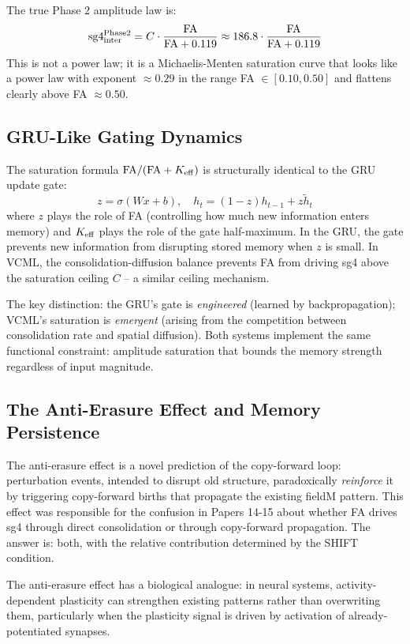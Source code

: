 \documentclass[11pt]{article}
\begin{document}
The true Phase 2 amplitude law is:
\begin{equation}
{\rm sg4}_{\rm inter}^{\rm Phase2} = C \cdot \frac{{\rm FA}}{{\rm FA} + 0.119}
\approx 186.8 \cdot \frac{{\rm FA}}{{\rm FA} + 0.119}
\end{equation}
This is not a power law; it is a Michaelis-Menten saturation curve that
looks like a power law with exponent $\approx 0.29$ in the range
FA $\in [0.10, 0.50]$ and flattens clearly above FA $\approx 0.50$.

\subsection{GRU-Like Gating Dynamics}

The saturation formula ${\rm FA}/({\rm FA} + K_{\rm eff})$ is structurally
identical to the GRU update gate:
\[
z = \sigma(W x + b), \quad h_t = (1-z) h_{t-1} + z \tilde{h}_t
\]
where $z$ plays the role of FA (controlling how much new information
enters memory) and $K_{\rm eff}$ plays the role of the gate half-maximum.
In the GRU, the gate prevents new information from disrupting stored
memory when $z$ is small.
In VCML, the consolidation-diffusion balance prevents FA from driving
sg4 above the saturation ceiling $C$ -- a similar ceiling mechanism.

The key distinction: the GRU's gate is \emph{engineered} (learned by
backpropagation); VCML's saturation is \emph{emergent} (arising from
the competition between consolidation rate and spatial diffusion).
Both systems implement the same functional constraint: amplitude saturation
that bounds the memory strength regardless of input magnitude.

\subsection{The Anti-Erasure Effect and Memory Persistence}

The anti-erasure effect is a novel prediction of the copy-forward loop:
perturbation events, intended to disrupt old structure, paradoxically
\emph{reinforce} it by triggering copy-forward births that propagate
the existing fieldM pattern.
This effect was responsible for the confusion in Papers 14-15 about
whether FA drives sg4 through direct consolidation or through copy-forward
propagation.
The answer is: both, with the relative contribution determined by the SHIFT
condition.

The anti-erasure effect has a biological analogue: in neural systems,
activity-dependent plasticity can strengthen existing patterns rather
than overwriting them, particularly when the plasticity signal is driven
by activation of already-potentiated synapses.
\end{document}
